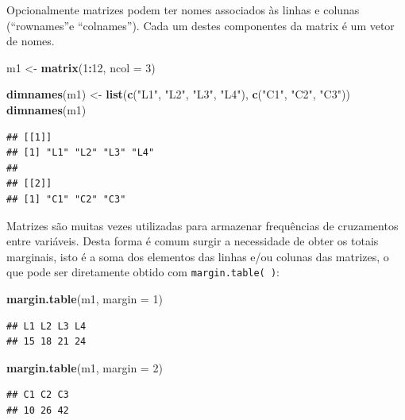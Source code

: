 \documentclass[
]{book}
\newenvironment{Shaded}{\begin{snugshade}}{\end{snugshade}}
\newcommand{\DataTypeTok}[1]{\textcolor[rgb]{0.13,0.29,0.53}{#1}}
\newcommand{\DecValTok}[1]{\textcolor[rgb]{0.00,0.00,0.81}{#1}}
\newcommand{\KeywordTok}[1]{\textcolor[rgb]{0.13,0.29,0.53}{\textbf{#1}}}
\newcommand{\NormalTok}[1]{#1}
\newcommand{\OperatorTok}[1]{\textcolor[rgb]{0.81,0.36,0.00}{\textbf{#1}}}
\newcommand{\StringTok}[1]{\textcolor[rgb]{0.31,0.60,0.02}{#1}}
\begin{document}
Opcionalmente matrizes podem ter nomes associados às linhas e colunas (``rownames''e ``colnames''). Cada um destes componentes da matrix é um vetor de nomes.

\begin{Shaded}
\begin{Highlighting}[]
\NormalTok{m1 <-}\StringTok{ }\KeywordTok{matrix}\NormalTok{(}\DecValTok{1}\OperatorTok{:}\DecValTok{12}\NormalTok{, }\DataTypeTok{ncol =} \DecValTok{3}\NormalTok{) }

\KeywordTok{dimnames}\NormalTok{(m1) <-}\StringTok{ }\KeywordTok{list}\NormalTok{(}\KeywordTok{c}\NormalTok{(}\StringTok{"L1"}\NormalTok{, }\StringTok{"L2"}\NormalTok{, }\StringTok{"L3"}\NormalTok{, }\StringTok{"L4"}\NormalTok{), }\KeywordTok{c}\NormalTok{(}\StringTok{"C1"}\NormalTok{, }\StringTok{"C2"}\NormalTok{, }\StringTok{"C3"}\NormalTok{)) }
\KeywordTok{dimnames}\NormalTok{(m1)}
\end{Highlighting}
\end{Shaded}

\begin{verbatim}
## [[1]]
## [1] "L1" "L2" "L3" "L4"
## 
## [[2]]
## [1] "C1" "C2" "C3"
\end{verbatim}

Matrizes são muitas vezes utilizadas para armazenar frequências de cruzamentos entre variáveis. Desta forma é comum surgir a necessidade de obter os totais marginais, isto é a soma dos elementos das linhas e/ou colunas das matrizes, o que pode ser diretamente obtido com \texttt{margin.table(\ )}:

\begin{Shaded}
\begin{Highlighting}[]
 \KeywordTok{margin.table}\NormalTok{(m1, }\DataTypeTok{margin =} \DecValTok{1}\NormalTok{)}
\end{Highlighting}
\end{Shaded}

\begin{verbatim}
## L1 L2 L3 L4 
## 15 18 21 24
\end{verbatim}

\begin{Shaded}
\begin{Highlighting}[]
 \KeywordTok{margin.table}\NormalTok{(m1, }\DataTypeTok{margin =} \DecValTok{2}\NormalTok{)}
\end{Highlighting}
\end{Shaded}

\begin{verbatim}
## C1 C2 C3 
## 10 26 42
\end{verbatim}
\end{document}
